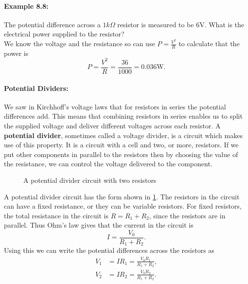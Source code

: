 \paragraph{Example 8.8:} The potential difference across a $1k\Omega$ resistor is measured to be $6\text{V}$. What is the electrical power supplied to the resistor?\\

We know the voltage and the resistance so can use $P=\frac{V^{2}}{R}$ to calculate that the power is
\begin{equation*}
P=\frac{V^{2}}{R}=\frac{36}{1000}=0.036\text{W}.
\end{equation*}


\paragraph{Potential Dividers:} We saw in Kirchhoff's voltage laws that for resistors in series the potential differences add. This means that combining resistors in series enables us to split the supplied voltage and deliver different voltages across each resistor. A \textbf{potential divider}, sometimes called a voltage divider, is a circuit which makes use of this property. It is a circuit with a cell and two, or more, resistors. If we put other components in parallel to the resistors then by choosing the value of the resistance, we can control the voltage delivered to the component.\\

  \begin{figure}[ht]
    \centering
    \caption{A potential divider circuit with two resistors}
    \label{fig: potential divider}
\end{figure}

A potential divider circuit has the form shown in \cref{fig: potential divider}. The resistors in the circuit can have a fixed resistance, or they can be variable resistors. For fixed resistors, the total resistance in the circuit is $R=R_{1}+R_{2}$, since the resistors are in parallel. Thus Ohm's law gives that the current in the circuit is
\begin{equation*}
I=\frac{V_{0}}{R_{1}+R_{2}}.
\end{equation*}
Using this we can write the potential differences across the resistors as
\begin{align*}
V_{1}&=IR_{1}=\frac{V_{0}R_{1}}{R_{1}+R_{2}},\\
V_{2}&=IR_{2}=\frac{V_{0}R_{2}}{R_{1}+R_{2}}.
\end{align*}

